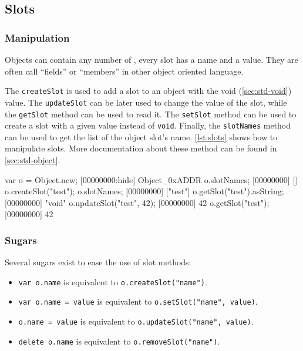 \subsection{Slots}

\subsubsection{Manipulation}

Objects can contain any number of , every slot has a name and a
value. They are often call ``fields'' or ``members'' in other object
oriented language.

The \lstinline|createSlot| is used to add a slot to an object with the
void (\autoref{sec:std-void}) value. The \lstinline|updateSlot| can be later
used to change the value of the slot, while the \lstinline|getSlot|
method can be used to read it. The \lstinline|setSlot| method can be
used to create a slot with a given value instead of
\lstinline|void|. Finally, the
\lstinline|slotNames| method can be used to get the list of the object
slot's name. \autoref{lst:slots} shows how to manipulate slots. More
documentation about these method can be found in \autoref{sec:std-object}.

\begin{urbiscript}[caption=Manipulating slots, label=lst:slots,
  float=\floatpos]
var o = Object.new;
[00000000:hide] Object_0xADDR
o.slotNames;
[00000000] []
o.createSlot("test");
o.slotNames;
[00000000] ["test"]
o.getSlot("test").asString;
[00000000] "void"
o.updateSlot("test", 42);
[00000000] 42
o.getSlot("test");
[00000000] 42
\end{urbiscript}

\subsubsection{Sugars}

Several sugars exist to ease the use of slot methods:

\begin{itemize}
\item \lstinline|var o.name| is equivalent to
  \lstinline|o.createSlot("name")|.
\item \lstinline|var o.name = value| is equivalent to
  \lstinline|o.setSlot("name", value)|.
\item \lstinline|o.name = value| is equivalent to
  \lstinline|o.updateSlot("name", value)|.
\item \lstinline|delete o.name| is equivalent to
  \lstinline|o.removeSlot("name")|.
\end{itemize}


